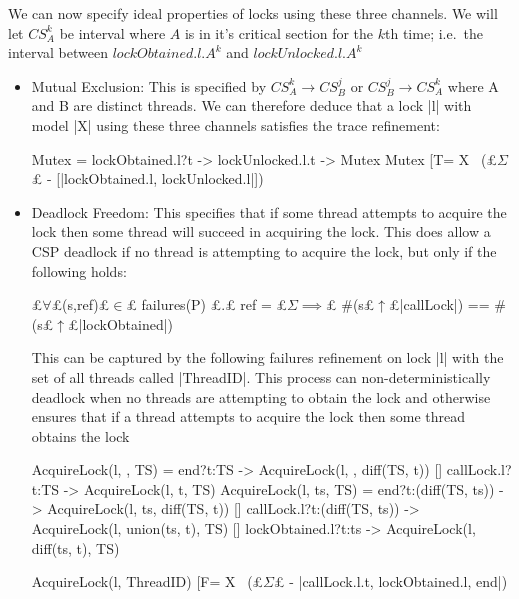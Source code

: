 We can now specify ideal properties of locks using these three channels. We will let $CS^{k}_{A}$ be interval where $A$ is in it's critical section for the $k$th time; i.e.~the interval between $lockObtained.l.A^{k}$ and $lockUnlocked.l.A^{k}$
\begin{itemize}
  \item Mutual Exclusion: This is specified by $CS^{k}_{A} \rightarrow CS^{j}_{B}$ or $CS^{j}_{B} \rightarrow CS^{k}_{A}$ where A and B are distinct threads. We can therefore deduce that a lock |l| with model |X| using these three channels satisfies the trace refinement:  
  
  \begin{cspm}
    Mutex = lockObtained.l?t -> lockUnlocked.l.t -> Mutex
    Mutex [T= X \ (£$\Sigma$£ - [|lockObtained.l, lockUnlocked.l|])\end{cspm}

  \item Deadlock Freedom: This specifies that if some thread attempts to acquire the lock then some thread will succeed in acquiring the lock\cite{TAoMP}. This does allow a CSP deadlock if no thread is attempting to acquire the lock, but only if the following holds: 
  
  \begin{cspm}
    £$\forall$£(s,ref)£$ \in$£ failures(P) £$.$£ ref = £$\Sigma \implies$£ #(s£$\uparrow$£{|callLock|}) == #(s£$\uparrow$£{|lockObtained|})\end{cspm}
  
  This can be captured by the following failures refinement on lock |l| with the set of all threads called |ThreadID|. This process can non-deterministically deadlock when no threads are attempting to obtain the lock and otherwise ensures that if a thread attempts to acquire the lock then some thread obtains the lock

  \begin{cspm}
    AcquireLock(l, {}, TS) = end?t:TS -> AcquireLock(l, {}, diff(TS, {t}))
                         [] callLock.l?t:TS -> AcquireLock(l, {t}, TS)
    AcquireLock(l, ts, TS) = end?t:(diff(TS, ts)) -> AcquireLock(l, ts, diff(TS, {t})) 
                         [] callLock.l?t:(diff(TS, ts)) -> AcquireLock(l, union(ts, {t}), TS)
                         [] lockObtained.l?t:ts -> AcquireLock(l, diff(ts, {t}), TS)

    AcquireLock(l, {} ThreadID) [F= X \ (£$\Sigma$£ - {|callLock.l.t, lockObtained.l, end|})


\end{cspm}
\end{itemize}
